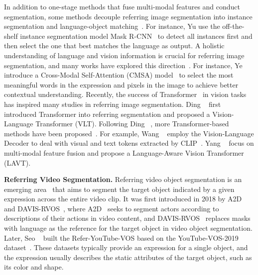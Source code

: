 \documentclass[10pt,twocolumn,letterpaper]{article}
\begin{document}
In addition to one-stage methods that fuse multi-modal features and conduct segmentation, some methods decouple referring image segmentation into instance segmentation and language-object matching~\cite{yu2018mattnet, ISFP, jing2021locate}. For instance, Yu \etal use the off-the-shelf instance segmentation model Mask R-CNN~\cite{he2017mask} to detect all instances first and then select the one that best matches the language as output. A holistic understanding of language and vision information is crucial for referring image segmentation, and many works have explored this direction~\cite{hui2020linguistic,yang2021bottom,ye2019cross}. For instance, Ye \etal introduce a Cross-Modal Self-Attention (CMSA) model~\cite{ye2019cross} to select the most meaningful words in the expression and pixels in the image to achieve better contextual understanding. Recently, the success of Transformer~\cite{vaswani2017attention} in vision tasks has inspired many studies in referring image segmentation. Ding \etal~\cite{vltpami,ding2021vision} first introduced Transformer into referring segmentation and proposed a Vision-Language Transformer (VLT). Following Ding \etal~\cite{vltpami,ding2021vision}, more Transformer-based methods have been proposed~\cite{yang2021lavt, wang2022cris, kim2022restr}. For example, Wang \etal~\cite{wang2022cris} employ the Vision-Language Decoder to deal with visual and text tokens extracted by CLIP~\cite{radford2021learning}. Yang \etal~\cite{yang2021lavt} focus on multi-modal feature fusion and propose a Language-Aware Vision Transformer (LAVT).


\noindent\textbf{Referring Video Segmentation.} Referring video object segmentation is an emerging area~\cite{wang2020context,ningpolar,wang2019asymmetric,mcintosh2020visual,liu2021cmpc,hui2021collaborative,Wu_2022_CVPR,zhao2022modeling,sun2022starting,chen2022multi,yang2022tubedetr,tang2021human} that aims to segment the target object indicated by a given expression across the entire video clip. It was first introduced in 2018 by A2D~\cite{gavrilyuk2018actor} and DAVIS-RVOS~\cite{khoreva2018video}, where A2D~\cite{gavrilyuk2018actor} seeks to segment actors according to descriptions of their actions in video content, and DAVIS-RVOS~\cite{khoreva2018video} replaces masks with language as the reference for the target object in video object segmentation. Later, Seo \etal~\cite{seo2020urvos} built the Refer-YouTube-VOS based on the YouTube-VOS-2019 dataset~\cite{xu2018youtube}. These datasets typically provide an expression for a single object, and the expression usually describes the static attributes of the target object, such as its color and shape.
\end{document}
